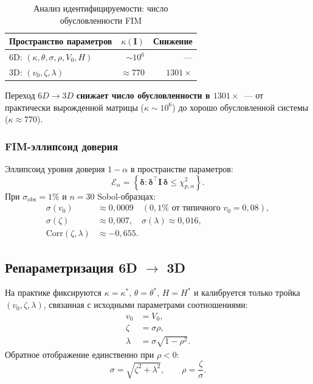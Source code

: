 \begin{table}[H]
\centering
\caption{Анализ идентифицируемости: число обусловленности FIM}
\label{tab:fim}
\begin{tabular}{l r r}
\toprule
Пространство параметров & $\kappa(\mathbf{I})$ & Снижение \\
\midrule
6D: $(\kappa, \theta, \sigma, \rho, V_0, H)$ & $\sim 10^6$ & --- \\
\rowcolor{tableblue}
3D: $(v_0, \zeta, \lambda)$                  & $\approx 770$ & $1301\times$ \\
\bottomrule
\end{tabular}
\end{table}

Переход $6D \to 3D$ \textbf{снижает число обусловленности в $1301\times$}~---
от практически вырожденной матрицы ($\kappa \sim 10^6$) до
хорошо обусловленной системы ($\kappa \approx 770$).

\subsubsection{FIM-эллипсоид доверия}

Эллипсоид уровня доверия $1-\alpha$ в пространстве параметров:
\[
  \mathcal{E}_\alpha = \left\{
    \boldsymbol\delta : \boldsymbol\delta^\top \mathbf{I}\,\boldsymbol\delta \leq \chi^2_{p,\alpha}
  \right\}.
\]
При $\sigma_{\text{obs}} = 1\%$ и $n=30$ Sobol-образцах:
\begin{align*}
  \sigma(v_0) &\approx 0{,}0009 \quad (0{,}1\%\text{ от типичного }v_0 = 0{,}08),\\
  \sigma(\zeta) &\approx 0{,}007,\quad \sigma(\lambda) \approx 0{,}016,\\
  \mathrm{Corr}(\zeta,\lambda) &\approx -0{,}655.
\end{align*}

\subsection{Репараметризация 6D $\to$ 3D}
\label{sec:reparam}

На практике фиксируются $\kappa = \kappa^*$, $\theta = \theta^*$, $H = H^*$
и калибруется только тройка $(v_0, \zeta, \lambda)$, связанная с
исходными параметрами соотношениями:
\begin{align}
  v_0 &= V_0,\\
  \zeta &= \sigma\rho,\\
  \lambda &= \sigma\sqrt{1-\rho^2}.
\end{align}
Обратное отображение единственно при $\rho < 0$:
\[
  \sigma = \sqrt{\zeta^2 + \lambda^2},\qquad
  \rho = \frac{\zeta}{\sigma}.
\]

